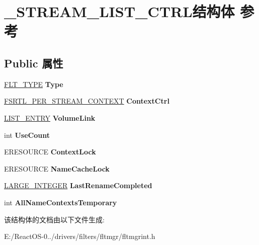 \hypertarget{struct___s_t_r_e_a_m___l_i_s_t___c_t_r_l}{}\section{\+\_\+\+S\+T\+R\+E\+A\+M\+\_\+\+L\+I\+S\+T\+\_\+\+C\+T\+R\+L结构体 参考}
\label{struct___s_t_r_e_a_m___l_i_s_t___c_t_r_l}
\subsection*{Public 属性}
\begin{DoxyCompactItemize}
\item 
\mbox{\label{struct___s_t_r_e_a_m___l_i_s_t___c_t_r_l_a1ec0ddc07b727503393f4f3387e799b6}} 
\hyperlink{struct___f_l_t___t_y_p_e}{F\+L\+T\+\_\+\+T\+Y\+PE} {\bfseries Type}
\item 
\mbox{\label{struct___s_t_r_e_a_m___l_i_s_t___c_t_r_l_a5983eb2b90a4c12194cdd6e833f7e349}} 
\hyperlink{struct___f_s_r_t_l___p_e_r___s_t_r_e_a_m___c_o_n_t_e_x_t}{F\+S\+R\+T\+L\+\_\+\+P\+E\+R\+\_\+\+S\+T\+R\+E\+A\+M\+\_\+\+C\+O\+N\+T\+E\+XT} {\bfseries Context\+Ctrl}
\item 
\mbox{\label{struct___s_t_r_e_a_m___l_i_s_t___c_t_r_l_a6b5d5d1bc0b7f2b80b9df3069b5e51e5}} 
\hyperlink{struct___l_i_s_t___e_n_t_r_y}{L\+I\+S\+T\+\_\+\+E\+N\+T\+RY} {\bfseries Volume\+Link}
\item 
\mbox{\label{struct___s_t_r_e_a_m___l_i_s_t___c_t_r_l_a7a2d25bc7492e607728cca441628722b}} 
int {\bfseries Use\+Count}
\item 
\mbox{\label{struct___s_t_r_e_a_m___l_i_s_t___c_t_r_l_a2e184e9b3ea09168c79bfea5c0ea456e}} 
E\+R\+E\+S\+O\+U\+R\+CE {\bfseries Context\+Lock}
\item 
\mbox{\label{struct___s_t_r_e_a_m___l_i_s_t___c_t_r_l_a57939a6d488032b8f9bea3a04d6b5a77}} 
E\+R\+E\+S\+O\+U\+R\+CE {\bfseries Name\+Cache\+Lock}
\item 
\mbox{\label{struct___s_t_r_e_a_m___l_i_s_t___c_t_r_l_a3b944a67fc563cf0d786629a86769997}} 
\hyperlink{union___l_a_r_g_e___i_n_t_e_g_e_r}{L\+A\+R\+G\+E\+\_\+\+I\+N\+T\+E\+G\+ER} {\bfseries Last\+Rename\+Completed}
\item 
\mbox{\label{struct___s_t_r_e_a_m___l_i_s_t___c_t_r_l_a2f11cf185cf86271b6853cf26cbbef26}} 
int {\bfseries All\+Name\+Contexts\+Temporary}
\end{DoxyCompactItemize}


该结构体的文档由以下文件生成\+:\begin{DoxyCompactItemize}
\item 
E\+:/\+React\+O\+S-\/0../drivers/filters/fltmgr/fltmgrint.\+h\end{DoxyCompactItemize}
